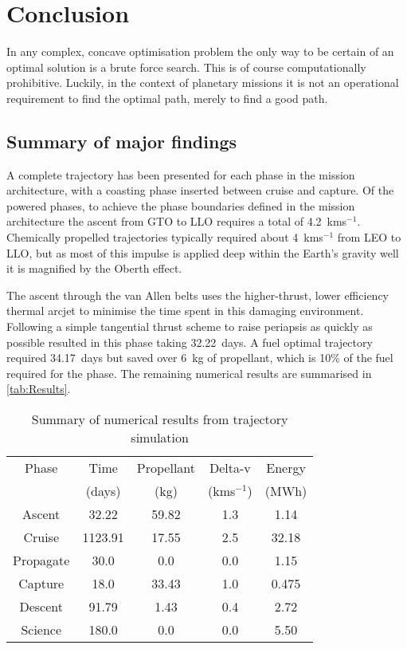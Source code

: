 \chapter{Conclusion} \label{cha:Conclusion}

In any complex, concave optimisation problem the only way to be certain of an optimal solution is a brute force search. This is of course computationally prohibitive. Luckily, in the context of planetary missions it is not an operational requirement to find the optimal path, merely to find a good path. 

\section{Summary of major findings}

A complete trajectory has been presented for each phase in the mission architecture, with a coasting phase inserted between cruise and capture. Of the powered phases, to achieve the phase boundaries defined in the mission architecture the ascent from GTO to LLO requires a total of 4.2~kms$^{-1}$. Chemically propelled trajectories typically required about 4~kms$^{-1}$ from LEO to LLO, but as most of this impulse is applied deep within the Earth's gravity well it is magnified by the Oberth effect.

The ascent through the van Allen belts uses the higher-thrust, lower efficiency thermal arcjet to minimise the time spent in this damaging environment. Following a simple tangential thrust scheme to raise periapsis as quickly as possible resulted in this phase taking 32.22~days. A fuel optimal trajectory required 34.17~days but saved over 6~kg of propellant, which is 10\% of the fuel required for the phase. The remaining numerical results are summarised in \autoref{tab:Results}.

\begin{table}
\caption{Summary of numerical results from trajectory simulation}
\label{tab:Results}
\centering
\begin{tabular}{ccccc} \toprule
Phase & Time & Propellant & Delta-v & Energy \tabularnewline
& (days) & (kg) & (kms$^{-1}$) & (MWh) \tabularnewline\midrule
Ascent & 32.22 & 59.82 & 1.3 & 1.14 \tabularnewline
Cruise & 1123.91 & 17.55 & 2.5 & 32.18 \tabularnewline
Propagate & 30.0 & 0.0 & 0.0 & 1.15 \tabularnewline
Capture &18.0 & 33.43 & 1.0 & 0.475 \tabularnewline
Descent & 91.79 & 1.43 & 0.4 & 2.72 \tabularnewline
Science &180.0 & 0.0 & 0.0 & 5.50 \tabularnewline\bottomrule
\end{tabular}
\end{table}

